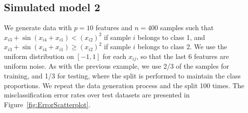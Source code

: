 \documentclass[twoside, onecolumn]{article}
\begin{document}




\subsection{Simulated model 2}
We generate data with $p=10$ features and $n=400$ samples such that $x_{i3}+\sin(x_{i4}+x_{i1})<(x_{i2})^2$ if sample $i$ belongs to class 1, and $x_{i3}+\sin(x_{i4}+x_{i1})\ge (x_{i2})^2$ if sample $i$ belongs to class 2. We use the uniform distribution on $[-1,1]$ for each $x_{ij}$, so that the last 6 features are uniform noise.
As with the previous example, we use 2/3 of the samples for training, and 1/3 for testing, where the split is performed to maintain the class proportions. We repeat the data generation process and the split 100 times. The misclassification error rates over test datasets are presented in Figure~\ref{fig:ErrorScatterplot}.

\end{document}

